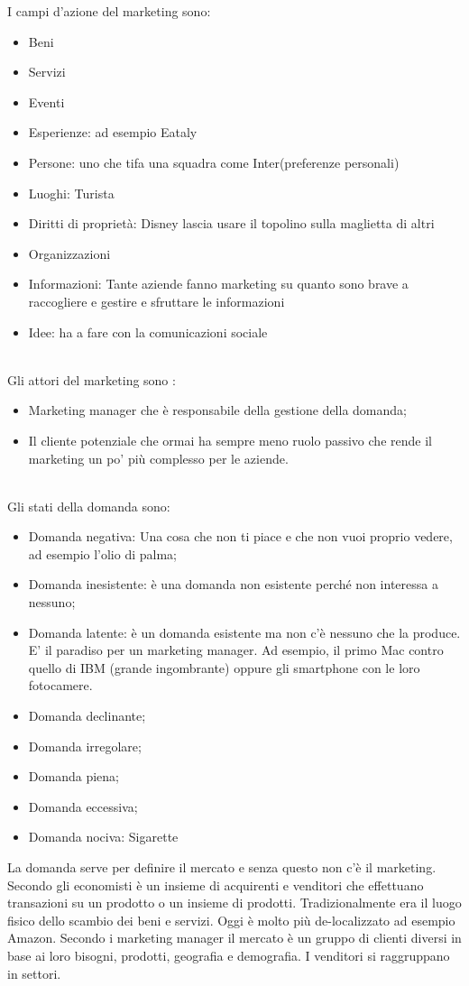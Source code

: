 \documentclass[11pt]{article}
\begin{document}
\noindent
I campi d'azione del marketing sono:
\begin{itemize}[noitemsep,topsep=0ex]
	\item Beni
	\item Servizi
	\item Eventi
	\item Esperienze: ad esempio Eataly
	\item Persone: uno che tifa una squadra come Inter(preferenze personali)
	\item Luoghi: Turista
	\item Diritti di proprietà: Disney lascia usare il topolino sulla maglietta di altri
	\item Organizzazioni
	\item Informazioni: Tante aziende fanno marketing su quanto sono brave a raccogliere e gestire e sfruttare le informazioni
	\item Idee: ha a fare con la comunicazioni sociale
\end{itemize}
~\\
Gli attori del marketing sono :
\begin{itemize}[noitemsep,topsep=0ex]
	\item Marketing manager che è responsabile della gestione della domanda;
	\item Il cliente potenziale che ormai ha sempre meno ruolo passivo che rende il marketing un po' più complesso per le aziende.
\end{itemize}
~\\
Gli stati della domanda sono:
\begin{itemize}[noitemsep,topsep=0ex]
	\item Domanda negativa: Una cosa che non ti piace e che non vuoi proprio vedere, ad esempio l'olio di palma;
	\item Domanda inesistente: è una domanda non esistente perché non interessa a nessuno;
	\item Domanda latente: è un domanda esistente ma non c'è nessuno che la produce. E' il paradiso per un marketing manager. Ad esempio, il primo Mac contro quello di IBM (grande ingombrante) oppure gli smartphone con le loro fotocamere.
	\item Domanda declinante;
	\item Domanda irregolare;
	\item Domanda piena;
	\item Domanda eccessiva;
	\item Domanda nociva: Sigarette
\end{itemize}
\noindent
La domanda serve per definire il mercato e senza questo non c'è il marketing.
Secondo gli economisti è un insieme di acquirenti e venditori che effettuano transazioni su un prodotto o un insieme di prodotti.
Tradizionalmente era il luogo fisico dello scambio dei beni e servizi. 
Oggi è molto più de-localizzato ad esempio Amazon.
Secondo i marketing manager il mercato è un gruppo di clienti diversi in base ai loro bisogni, prodotti, geografia e demografia. I venditori si raggruppano in settori. 
~\\
\end{document}
